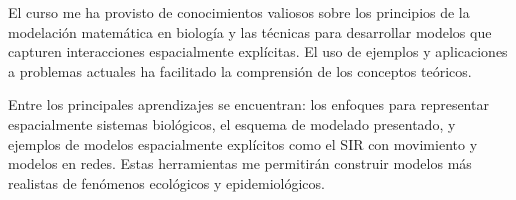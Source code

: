 \documentclass[fleqn,10pt]{SelfArx_063318} %
\begin{document}
El curso me ha provisto de conocimientos valiosos sobre los principios de la modelación matemática en biología 
y las técnicas para desarrollar modelos que capturen interacciones espacialmente explícitas. El uso de ejemplos 
y aplicaciones a problemas actuales ha facilitado la comprensión de los conceptos teóricos.

Entre los principales aprendizajes se encuentran: los enfoques para representar espacialmente sistemas biológicos, 
el esquema de modelado presentado, y ejemplos de modelos espacialmente explícitos como el SIR con movimiento y 
modelos en redes. Estas herramientas me permitirán construir modelos más realistas de fenómenos ecológicos y 
epidemiológicos.















\end{document}
